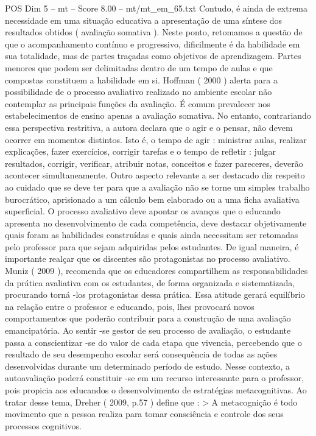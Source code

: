 \begin{textsample}{POS Dim 5 – mt – Score 8.00 – mt/mt\_em\_65.txt}
Contudo, é ainda de extrema necessidade em uma situação educativa a apresentação de uma síntese dos resultados obtidos ( avaliação somativa ).
Neste ponto, retomamos a questão de que o acompanhamento contínuo e progressivo, dificilmente é da habilidade em sua totalidade, mas de partes traçadas como objetivos de aprendizagem.
Partes menores que podem ser delimitadas dentro de um tempo de aulas e que compostas constituem a habilidade em si.
Hoffman ( 2000 ) alerta para a possibilidade de o processo avaliativo realizado no ambiente escolar não contemplar as principais funções da avaliação.
É comum prevalecer nos estabelecimentos de ensino apenas a avaliação somativa.
No entanto, contrariando essa perspectiva restritiva, a autora declara que o agir e o pensar, não devem ocorrer em momentos distintos.
Isto é, o tempo de agir : ministrar aulas, realizar explicações, fazer exercícios, corrigir tarefas e o tempo de refletir : julgar resultados, corrigir, verificar, atribuir notas, conceitos e fazer pareceres, deverão acontecer simultaneamente.
Outro aspecto relevante a ser destacado diz respeito ao cuidado que se deve ter para que a avaliação não se torne um simples trabalho burocrático, aprisionado a um cálculo bem elaborado ou a uma ficha avaliativa superficial.
O processo avaliativo deve apontar os avanços que o educando apresenta no desenvolvimento de cada competência, deve destacar objetivamente quais foram as habilidades construídas e quais ainda necessitam ser retomadas pelo professor para que sejam adquiridas pelos estudantes.
De igual maneira, é importante realçar que os discentes são protagonistas no processo avaliativo.
Muniz ( 2009 ), recomenda que os educadores compartilhem as responsabilidades da prática avaliativa com os estudantes, de forma organizada e sistematizada, procurando torná -los protagonistas dessa prática.
Essa atitude gerará equilíbrio na relação entre o professor e educando, pois, lhes provocará novos comportamentos que poderão contribuir para a construção de uma avaliação emancipatória.
Ao sentir -se gestor de seu processo de avaliação, o estudante passa a conscientizar -se do valor de cada etapa que vivencia, percebendo que o resultado de seu desempenho escolar será consequência de todas as ações desenvolvidas durante um determinado período de estudo.
Nesse contexto, a autoavaliação poderá constituir -se em um recurso interessante para o professor, pois propicia aos educandos o desenvolvimento de estratégias metacognitivas.
Ao tratar desse tema, Dreher ( 2009, p.57 ) define que : > A metacognição é todo movimento que a pessoa realiza para tomar consciência e controle dos seus processos cognitivos.

\end{textsample}

